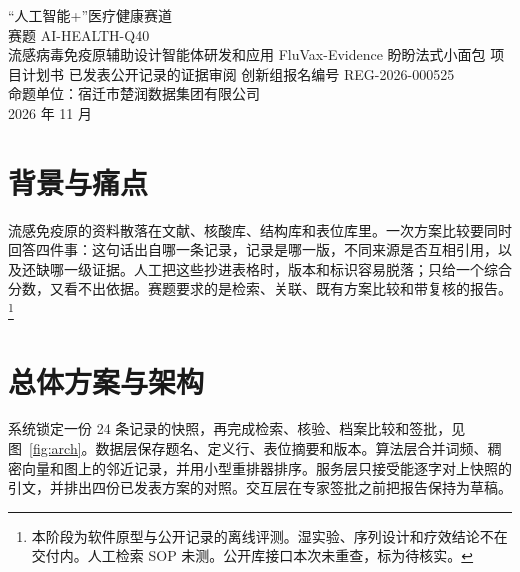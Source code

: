 

\contesttitlepage
  {“人工智能+”医疗健康赛道\\赛题 AI-HEALTH-Q40\\流感病毒免疫原辅助设计智能体研发和应用}
  {FluVax-Evidence}
  {盼盼法式小面包}
  {项目计划书}
  {已发表公开记录的证据审阅}
  {创新组\quad 报名编号 REG-2026-000525\\命题单位：宿迁市楚润数据集团有限公司\\2026 年 11 月}

\begin{abstract}
FluVax-Evidence 把已发表的公开记录收成可签批的问答和方案对照。7 道封闭题的 Recall@5 为 1.00，NDCG@5 为 0.929；四份档案与金标一致；通过原文与版本锁的语句为 59/59。
\end{abstract}

\section{背景与痛点}
流感免疫原的资料散落在文献、核酸库、结构库和表位库里。一次方案比较要同时回答四件事：这句话出自哪一条记录，记录是哪一版，不同来源是否互相引用，以及还缺哪一级证据。人工把这些抄进表格时，版本和标识容易脱落；只给一个综合分数，又看不出依据。赛题要求的是检索、关联、既有方案比较和带复核的报告。\footnote{本阶段为软件原型与公开记录的离线评测。湿实验、序列设计和疗效结论不在交付内。人工检索 SOP 未测。公开库接口本次未重查，标为待核实。}

\section{总体方案与架构}
系统锁定一份 24 条记录的快照，再完成检索、核验、档案比较和签批，见图~\ref{fig:arch}。数据层保存题名、定义行、表位摘要和版本。算法层合并词频、稠密向量和图上的邻近记录，并用小型重排器排序。服务层只接受能逐字对上快照的引文，并排出四份已发表方案的对照。交互层在专家签批之前把报告保持为草稿。

